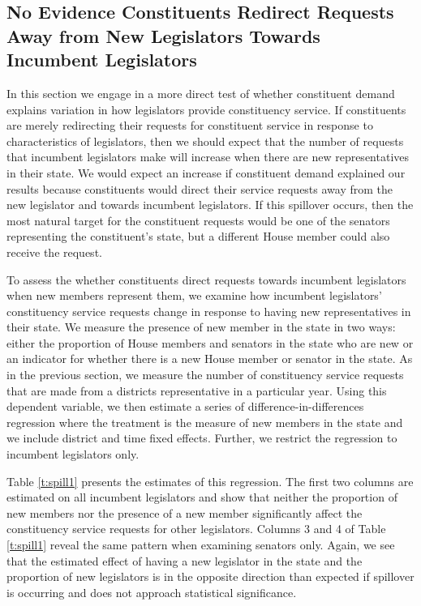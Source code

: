 \documentclass[12pt]{article}
\begin{document}
\subsection{No Evidence Constituents Redirect Requests Away from New Legislators Towards Incumbent Legislators}
In this section we engage in a more direct test of whether constituent demand explains variation in how legislators provide constituency service. If constituents are merely redirecting their requests for constituent service in response to characteristics of legislators, then we should expect that the number of requests that incumbent legislators make will increase when there are new representatives in their state. We would expect an increase if constituent demand explained our results because constituents would direct their service requests away from the new legislator and towards incumbent legislators. If this spillover occurs, then the most natural target for the constituent requests would be one of the senators representing the constituent's state, but a different House member could also receive the request.   

To assess the whether constituents direct requests towards incumbent legislators when new members represent them, we examine how incumbent legislators' constituency service requests change in response to having new representatives in their state. We measure the presence of new member in the state in two ways: either the proportion of House members and senators in the state who are new or an indicator for whether there is a new House member or senator in the state. As in the previous section, we measure the number of constituency service requests that are made from a districts representative in a particular year. Using this dependent variable, we then estimate a series of difference-in-differences regression where the treatment is the measure of new members in the state and we include district and time fixed effects. Further, we restrict the regression to incumbent legislators only.   

Table \ref{t:spill1} presents the estimates of this regression. The first two columns are estimated on all incumbent legislators and show that neither the proportion of new members nor the presence of a new member significantly affect the constituency service requests for other legislators. Columns 3 and 4 of Table \ref{t:spill1} reveal the same pattern when examining senators only. Again, we see that the estimated effect of having a new legislator in the state and the proportion of new legislators is in the opposite direction than expected if spillover is occurring and does not approach statistical significance.  
\end{document}
